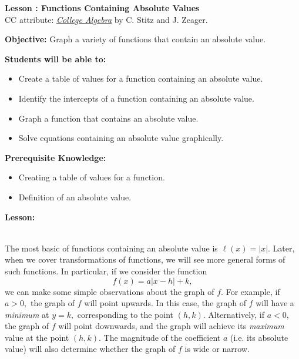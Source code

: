 \documentclass[12pt]{article}
\theoremstyle{definition}
\begin{document}
{\bf \large Lesson : Functions Containing Absolute Values}\label{les:functions_containing_absolute_values}
\\ CC attribute: \href{http://www.stitz-zeager.com}{\it{College Algebra}} by C. Stitz and J. Zeager. 
\hfill \doclicenseImage[imagewidth=5em]\\
\par
{\bf Objective:} Graph a variety of functions that contain an absolute value.\\
\par
{\bf Students will be able to:}
\begin{itemize}
	\item Create a table of values for a function containing an absolute value.
	\item Identify the intercepts of a function containing an absolute value.
	\item Graph a function that contains an absolute value.
	\item Solve equations containing an absolute value graphically.
\end{itemize}
{\bf Prerequisite Knowledge:}
\begin{itemize}
	\item Creating a table of values for a function.
	\item Definition of an absolute value.
\end{itemize}
\hrulefill

{\bf Lesson:}\\
\ \par
The most basic of functions containing an absolute value is $\ell(x)=|x|$.  Later, when we cover transformations of functions, we will see more general forms of such functions.  In particular, if we consider the function
$$f(x)=a|x-h|+k,$$
we can make some simple observations about the graph of $f$.  For example, if $a>0,$ the graph of $f$ will point upwards.  In this case, the graph of $f$ will have a {\it minimum} at $y=k,$ corresponding to the point $(h,k)$.  Alternatively, if $a<0,$ the graph of $f$ will point downwards, and the graph will achieve its {\it maximum} value at the point $(h,k)$.  The magnitude of the coefficient $a$ (i.e. its absolute value) will also determine whether the graph of $f$ is wide or narrow.

\newpage
\end{document}
